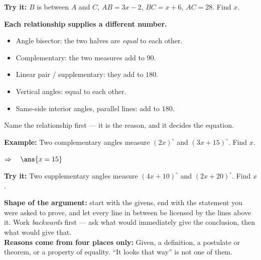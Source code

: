 \documentclass[12pt]{article}
\begin{document}
\begin{tryitbox}
\textbf{Try it:} $B$ is between $A$ and $C$, $AB = 3x - 2$, $BC = x + 6$,
$AC = 28$. Find $x$.\\[2pt]
\end{tryitbox}


\begin{formulabox}
\textbf{Each relationship supplies a different number.}
\begin{itemize}[leftmargin=1.1cm, itemsep=1pt, topsep=2pt]
\item Angle bisector: the two halves are \emph{equal} to each other.
\item Complementary: the two measures add to $90$.
\item Linear pair / supplementary: they add to $180$.
\item Vertical angles: equal to each other.
\item Same-side interior angles, parallel lines: add to $180$.
\end{itemize}
Name the relationship first --- it is the reason, and it decides the equation.
\end{formulabox}

\begin{examplebox}
\textbf{Example:} Two complementary angles measure $(2x)^\circ$ and
$(3x + 15)^\circ$. Find $x$.

$\Rightarrow\quad \ans{x = 15}$
\end{examplebox}

\begin{tryitbox}
\textbf{Try it:} Two supplementary angles measure $(4x + 10)^\circ$ and
$(2x + 20)^\circ$. Find $x$.\\[2pt]
\end{tryitbox}


\begin{formulabox}
\textbf{Shape of the argument:} start with the givens, end with the statement
you were asked to prove, and let every line in between be licensed by the
lines above it. Work \emph{backwards} first --- ask what would immediately
give the conclusion, then what would give that.\\[3pt]
\textbf{Reasons come from four places only:} Given, a definition, a postulate
or theorem, or a property of equality. ``It looks that way'' is not one of
them.
\end{formulabox}
\end{document}
